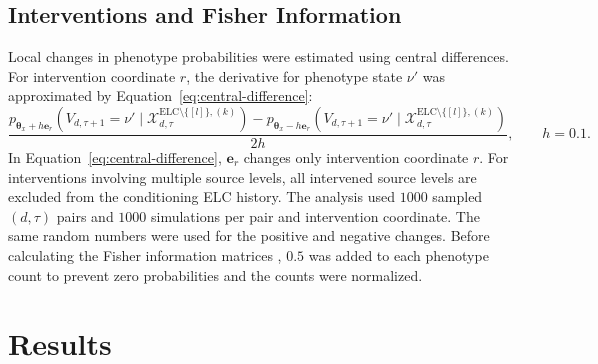 \documentclass[11pt]{article}
\newcommand{\ELC}{\mathrm{ELC}}
\begin{document}
\subsection{Interventions and Fisher Information}
Local changes in phenotype probabilities were estimated using central differences. For intervention coordinate $r$, the derivative for phenotype state $\nu'$ was approximated by Equation~\ref{eq:central-difference}:
\begin{equation}
\frac{
p_{\boldsymbol{\theta}_x+h\mathbf{e}_r}\left(
V_{d,\tau+1}=\nu'
\mid
\mathcal{X}^{\ELC\setminus\{[l]\},(k)}_{d,\tau}
\right)
-
p_{\boldsymbol{\theta}_x-h\mathbf{e}_r}\left(
V_{d,\tau+1}=\nu'
\mid
\mathcal{X}^{\ELC\setminus\{[l]\},(k)}_{d,\tau}
\right)
}{
2h
},
\qquad
h=0.1.
\label{eq:central-difference}
\end{equation}
In Equation~\ref{eq:central-difference}, $\mathbf{e}_r$ changes only intervention coordinate $r$. For interventions involving multiple source levels, all intervened source levels are excluded from the conditioning ELC history. The analysis used $1000$ sampled $(d,\tau)$ pairs and $1000$ simulations per pair and intervention coordinate. The same random numbers were used for the positive and negative changes. Before calculating the Fisher information matrices \cite{fisher1925,amari2016}, $0.5$ was added to each phenotype count to prevent zero probabilities and the counts were normalized.

\section{Results}
\end{document}
